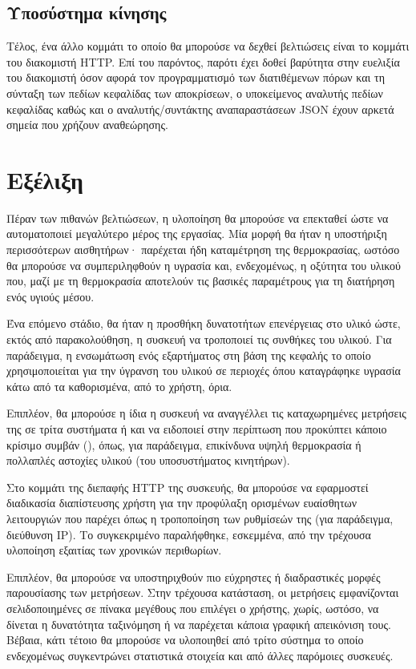 
\subsection*{Υποσύστημα κίνησης}

Τέλος, ένα άλλο κομμάτι το οποίο θα μπορούσε να δεχθεί βελτιώσεις είναι το
κομμάτι του διακομιστή HTTP. Επί του παρόντος, παρότι έχει δοθεί βαρύτητα στην
ευελιξία του διακομιστή όσον αφορά τον προγραμματισμό των διατιθέμενων πόρων και
τη σύνταξη των πεδίων κεφαλίδας των αποκρίσεων, ο υποκείμενος αναλυτής πεδίων
κεφαλίδας καθώς και ο αναλυτής\slash{}συντάκτης αναπαραστάσεων JSON έχουν αρκετά
σημεία που χρήζουν αναθεώρησης.


\section{Εξέλιξη}

Πέραν των πιθανών βελτιώσεων, η υλοποίηση θα μπορούσε να επεκταθεί ώστε να
αυτοματοποιεί μεγαλύτερο μέρος της εργασίας. Μία μορφή θα ήταν η υποστήριξη
περισσότερων αισθητήρων· παρέχεται ήδη καταμέτρηση της θερμοκρασίας, ωστόσο θα
μπορούσε να συμπεριληφθούν η υγρασία και, ενδεχομένως, η οξύτητα του υλικού που,
μαζί με τη θερμοκρασία αποτελούν τις βασικές παραμέτρους για τη διατήρηση ενός
υγιούς μέσου.

Ένα επόμενο στάδιο, θα ήταν η προσθήκη δυνατοτήτων επενέργειας στο υλικό ώστε,
εκτός από παρακολούθηση, η συσκευή να τροποποιεί τις συνθήκες του υλικού. Για
παράδειγμα, η ενσωμάτωση ενός εξαρτήματος στη βάση της κεφαλής το οποίο
χρησιμοποιείται για την ύγρανση του υλικού σε περιοχές όπου καταγράφηκε υγρασία
κάτω από τα καθορισμένα, από το χρήστη, όρια.

Επιπλέον, θα μπορούσε η ίδια η συσκευή να αναγγέλλει τις καταχωρημένες μετρήσεις
της σε τρίτα συστήματα ή και να ειδοποιεί στην περίπτωση που προκύπτει κάποιο
κρίσιμο συμβάν (), όπως, για παράδειγμα, επικίνδυνα υψηλή θερμοκρασία
ή πολλαπλές αστοχίες υλικού (του υποσυστήματος κινητήρων).

Στο κομμάτι της διεπαφής HTTP της συσκευής, θα μπορούσε να εφαρμοστεί διαδικασία
διαπίστευσης χρήστη για την προφύλαξη ορισμένων ευαίσθητων λειτουργιών που
παρέχει όπως η τροποποίηση των ρυθμίσεών της (για παράδειγμα, διεύθυνση IP). Το
συγκεκριμένο παραλήφθηκε, εσκεμμένα, από την τρέχουσα υλοποίηση εξαιτίας των
χρονικών περιθωρίων.

Επιπλέον, θα μπορούσε να υποστηριχθούν πιο εύχρηστες ή διαδραστικές μορφές
παρουσίασης των μετρήσεων. Στην τρέχουσα κατάσταση, οι μετρήσεις εμφανίζονται
σελιδοποιημένες σε πίνακα μεγέθους που επιλέγει ο χρήστης, χωρίς, ωστόσο, να
δίνεται η δυνατότητα ταξινόμηση ή να παρέχεται κάποια γραφική απεικόνιση τους.
Βέβαια, κάτι τέτοιο θα μπορούσε να υλοποιηθεί από τρίτο σύστημα το οποίο
ενδεχομένως συγκεντρώνει στατιστικά στοιχεία και από άλλες παρόμοιες συσκευές.
